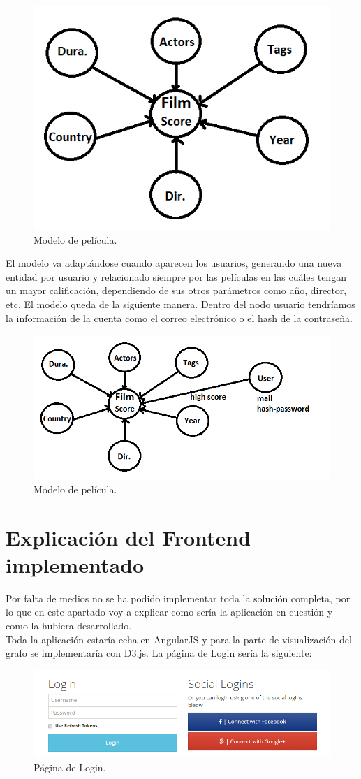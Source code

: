 \documentclass[12pt,a4paper]{article}
\begin{document}
		\begin{figure}[tbph!]
		 	\centering
		 	\includegraphics[width=0.5\linewidth]{images/Modelo}
		 	\caption{Modelo de película.}
		 	\label{fig:ModeloPelicula}
		\end{figure}
		El modelo va adaptándose cuando aparecen los usuarios, generando una nueva entidad por usuario y relacionado siempre por las películas en las cuáles tengan un mayor calificación, dependiendo de sus otros parámetros como año, director, etc.
		El modelo queda de la siguiente manera. Dentro del nodo usuario tendríamos la información de la cuenta como el correo electrónico o el hash de la contraseña.
		
		\begin{figure}[tbph!]
			\centering
			\includegraphics[width=0.5\linewidth]{images/Modelo_con_usuario}
			\caption{Modelo de película.}
			\label{fig:ModeloPelicula}
		\end{figure}
		
		\clearpage
		\section{Explicación del Frontend implementado}
		Por falta de medios no se ha podido implementar toda la solución completa, por lo que en este apartado voy a explicar como sería la aplicación en cuestión y como la hubiera desarrollado.\\
		
		Toda la aplicación estaría echa en AngularJS y para la parte de visualización del grafo se implementaría con D3.js. La página de Login sería la siguiente:
		
		\begin{figure}[tbph!]
			\centering
			\includegraphics[width=0.7\linewidth]{images/Login}
			\caption{Página de Login.}
			\label{fig:Login}
		\end{figure}
		
\end{document}
